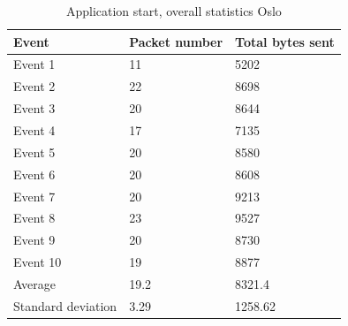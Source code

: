 \begin{table}[H]
\centering
\caption{Application start, overall statistics Oslo}
\label{tab:ASoverallOslo}
\begin{tabular}{|l|l|l|}
\hline
\textbf{Event} & \textbf{Packet number} & \textbf{Total bytes sent} \\ \hline
Event 1        & 11                     & 5202                      \\ \hline
Event 2        & 22                     & 8698                      \\ \hline
Event 3        & 20                     & 8644                      \\ \hline
Event 4        & 17                     & 7135                      \\ \hline
Event 5        & 20                     & 8580                      \\ \hline
Event 6        & 20                     & 8608                      \\ \hline
Event 7        & 20                     & 9213                      \\ \hline
Event 8        & 23                     & 9527                      \\ \hline
Event 9        & 20                     & 8730                      \\ \hline
Event 10       & 19                     & 8877                      \\ \hline
Average        & 19.2                   & 8321.4                    \\ \hline
Standard deviation        & 3.29
       & 1258.62               \\ \hline
\end{tabular}
\end{table}

